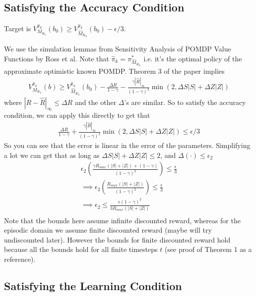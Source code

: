 \documentclass[10pt,english]{article}
\begin{document}
\subsection{Satisfying the Accuracy Condition}

Target is $V^{\widehat{\pi}_k}_{M_{K_t}}(b_0) \geq V^{\widehat{\pi}_k}_{\widehat{M}_{K_k}}(b_0) -\epsilon/3$.

We use the simulation lemmas from Sensitivity Analysis of POMDP Value Functions by Ross et al. Note that $\widehat{\pi}_k = \pi^*_{\widehat{M}_{K_k}}$ i.e. it's the optimal policy of the approximate optimistic known POMDP. Theorem 3 of the paper implies
\begin{align}
V^{\widehat{\pi}_k}_{M_{K_k}}(b) \geq V^{\widehat{\pi}_k}_{\widehat{M}_{K_k}}(b_0) - \frac{\Delta R}{1-\gamma} - \frac{\gamma |\widehat{R}|_\infty}{(1-\gamma)^2}\min(2, \Delta S |S| + \Delta Z |Z|)
\end{align}
where $|R - \widehat{R}|_\infty \leq \Delta R$ and the other $\Delta$'s are similar. So to satisfy the accuracy condition, we can apply this directly to get that
\begin{align}
\frac{\Delta R}{1-\gamma} + \frac{\gamma |\widehat{R}|_\infty}{(1-\gamma)^2}\min(2, \Delta S |S| + \Delta Z |Z|) \leq \epsilon/3
\end{align}
So you can see that the error is linear in the error of the parameters. Simplifying a lot we can get that as long as $\Delta S |S| + \Delta Z |Z| \leq 2$, and $\Delta (\cdot) \leq \epsilon_2$
\begin{align}
\epsilon_2 \left(\frac{\gamma R_{max} (|S| + |Z|) + (1-\gamma)}{(1-\gamma)^2} \right) \leq \frac{\epsilon}{3} \\
\implies \epsilon_2 \left(\frac{R_{max} (|S| + |Z|) }{(1-\gamma)^2} \right) \leq \frac{\epsilon}{3} \\
\implies \epsilon_2 \leq \frac{\epsilon(1-\gamma)^2}{3 R_{max}(|S| + |Z|)} \\
\end{align}
Note that the bounds here assume infinite discounted reward, whereas for the episodic domain we assume finite discounted reward (maybe will try undiscounted later). However the bounds for finite discounted reward hold because all the bounds hold for all finite timesteps $t$ (see proof of Theorem 1 as a reference).

\subsection{Satisfying the Learning Condition}
\end{document}
